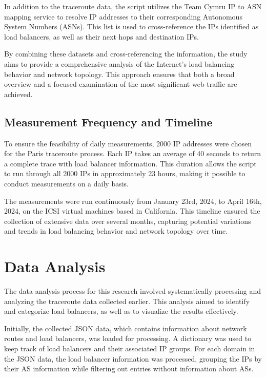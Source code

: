\documentclass[12pt]{cwru_thesis}
\begin{document}
In addition to the traceroute data, the script utilizes the Team Cymru IP to ASN mapping service to resolve IP addresses to their corresponding Autonomous System Numbers (ASNs). This list is used to cross-reference the IPs identified as load balancers, as well as their next hops and destination IPs.

By combining these datasets and cross-referencing the information, the study aims to provide a comprehensive analysis of the Internet's load balancing behavior and network topology. This approach ensures that both a broad overview and a focused examination of the most significant web traffic are achieved.

\subsection{Measurement Frequency and Timeline}

To ensure the feasibility of daily measurements, 2000 IP addresses were chosen for the Paris traceroute process. Each IP takes an average of 40 seconds to return a complete trace with load balancer information. This duration allows the script to run through all 2000 IPs in approximately 23 hours, making it possible to conduct measurements on a daily basis.

The measurements were run continuously from January 23rd, 2024, to April 16th, 2024, on the ICSI virtual machines based in California. This timeline ensured the collection of extensive data over several months, capturing potential variations and trends in load balancing behavior and network topology over time.



\section{Data Analysis}

The data analysis process for this research involved systematically processing and analyzing the traceroute data collected earlier. This analysis aimed to identify and categorize load balancers, as well as to visualize the results effectively.

Initially, the collected JSON data, which contains information about network routes and load balancers, was loaded for processing. A dictionary was used to keep track of load balancers and their associated IP groups. For each domain in the JSON data, the load balancer information was processed, grouping the IPs by their AS information while filtering out entries without information about ASs.
\end{document}
